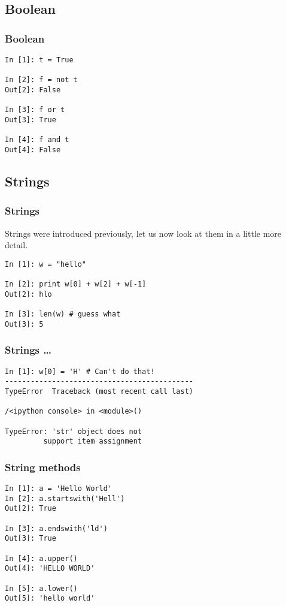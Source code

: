 \documentclass[14pt,compress]{beamer}
\begin{document}
\subsection{Boolean}
\begin{frame}[fragile]
  \frametitle{Boolean}
  \begin{lstlisting}
In [1]: t = True

In [2]: f = not t
Out[2]: False

In [3]: f or t
Out[3]: True

In [4]: f and t
Out[4]: False
  \end{lstlisting}
\end{frame}

\subsection{Strings}

\begin{frame}[fragile]
  \frametitle{Strings}
Strings were introduced previously, let us now look at them in a little more detail.
  \begin{lstlisting}
In [1]: w = "hello"

In [2]: print w[0] + w[2] + w[-1]
Out[2]: hlo

In [3]: len(w) # guess what
Out[3]: 5
  \end{lstlisting}
\end{frame}

\begin{frame}[fragile]
  \frametitle{Strings \ldots}
  \begin{lstlisting}
In [1]: w[0] = 'H' # Can't do that!
--------------------------------------------
TypeError  Traceback (most recent call last)

/<ipython console> in <module>()

TypeError: 'str' object does not
         support item assignment
  \end{lstlisting}
\end{frame}

\begin{frame}[fragile]
  \frametitle{String methods}
  \begin{lstlisting}
In [1]: a = 'Hello World'
In [2]: a.startswith('Hell')
Out[2]: True

In [3]: a.endswith('ld')
Out[3]: True

In [4]: a.upper()
Out[4]: 'HELLO WORLD'

In [5]: a.lower()
Out[5]: 'hello world'
  \end{lstlisting}
\end{frame}
\end{document}
